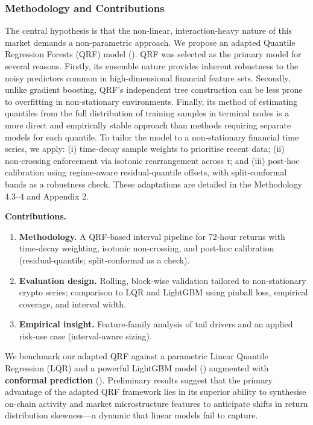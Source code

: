 \documentclass[
  a4paper,
  DIV=11,
  numbers=noendperiod]{scrreprt}
\providecommand{\tightlist}{%
  \setlength{\itemsep}{0pt}\setlength{\parskip}{0pt}}
\begin{document}
\subsubsection{Methodology and
Contributions}\label{methodology-and-contributions}

The central hypothesis is that the non-linear, interaction-heavy nature
of this market demands a non-parametric approach. We propose an adapted
Quantile Regression Forests (QRF) model
(). QRF was selected as
the primary model for several reasons. Firstly, its ensemble nature
provides inherent robustness to the noisy predictors common in
high-dimensional financial feature sets. Secondly, unlike gradient
boosting, QRF's independent tree construction can be less prone to
overfitting in non-stationary environments. Finally, its method of
estimating quantiles from the full distribution of training samples in
terminal nodes is a more direct and empirically stable approach than
methods requiring separate models for each quantile. To tailor the model
to a non‑stationary financial time series, we apply: (i) time‑decay
sample weights to prioritise recent data; (ii) non‑crossing enforcement
via isotonic rearrangement across τ; and (iii) post‑hoc calibration
using regime‑aware residual‑quantile offsets, with split‑conformal bands
as a robustness check. These adaptations are detailed in the Methodology
4.3--4 and Appendix 2.

\textbf{Contributions.}

\begin{enumerate}
\def\labelenumi{\arabic{enumi}.}
\tightlist
\item
  \textbf{Methodology.} A QRF‑based interval pipeline for 72‑hour
  returns with time‑decay weighting, isotonic non‑crossing, and post‑hoc
  calibration (residual‑quantile; split‑conformal as a check).
\item
  \textbf{Evaluation design.} Rolling, block‑wise validation tailored to
  non‑stationary crypto series; comparison to LQR and LightGBM using
  pinball loss, empirical coverage, and interval width.
\item
  \textbf{Empirical insight.} Feature‑family analysis of tail drivers
  and an applied risk‑use case (interval‑aware sizing).
\end{enumerate}

We benchmark our adapted QRF against a parametric Linear Quantile
Regression (LQR) and a powerful LightGBM model () augmented with \textbf{conformal prediction}
().
Preliminary results suggest that the primary advantage of the adapted
QRF framework lies in its superior ability to synthesise on-chain
activity and market microstructure features to anticipate shifts in
return distribution skewness---a dynamic that linear models fail to
capture.
\end{document}
